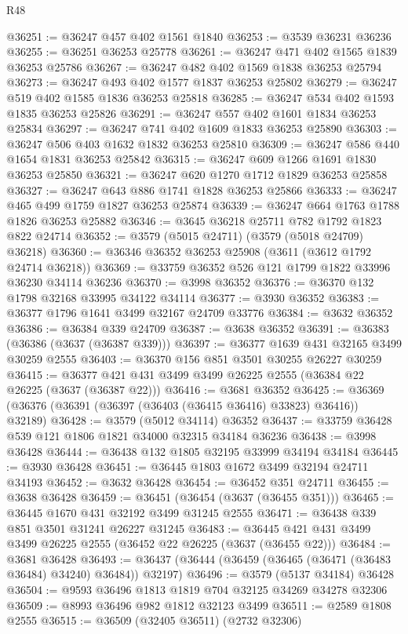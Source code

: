 \begin{lexlean}{R48}
\begin{coremodule}
@36251 := @36247 @457 @402 @1561 @1840
@36253 := @3539 @36231 @36236
@36255 := @36251 @36253 @25778
@36261 := @36247 @471 @402 @1565 @1839 @36253 @25786
@36267 := @36247 @482 @402 @1569 @1838 @36253 @25794
@36273 := @36247 @493 @402 @1577 @1837 @36253 @25802
@36279 := @36247 @519 @402 @1585 @1836 @36253 @25818
@36285 := @36247 @534 @402 @1593 @1835 @36253 @25826
@36291 := @36247 @557 @402 @1601 @1834 @36253 @25834
@36297 := @36247 @741 @402 @1609 @1833 @36253 @25890
@36303 := @36247 @506 @403 @1632 @1832 @36253 @25810
@36309 := @36247 @586 @440 @1654 @1831 @36253 @25842
@36315 := @36247 @609 @1266 @1691 @1830 @36253 @25850
@36321 := @36247 @620 @1270 @1712 @1829 @36253 @25858
@36327 := @36247 @643 @886 @1741 @1828 @36253 @25866
@36333 := @36247 @465 @499 @1759 @1827 @36253 @25874
@36339 := @36247 @664 @1763 @1788 @1826 @36253 @25882
@36346 := @3645 @36218 @25711 @782 @1792 @1823 @822 @24714
@36352 := @3579 (@5015 @24711) (@3579 (@5018 @24709) @36218)
@36360 := @36346 @36352 @36253 @25908 (@3611 (@3612 @1792 @24714 @36218))
@36369 := @33759 @36352 @526 @121 @1799 @1822 @33996 @36230 @34114 @36236
@36370 := @3998 @36352
@36376 := @36370 @132 @1798 @32168 @33995 @34122 @34114
@36377 := @3930 @36352
@36383 := @36377 @1796 @1641 @3499 @32167 @24709 @33776
@36384 := @3632 @36352
@36386 := @36384 @339 @24709
@36387 := @3638 @36352
@36391 := @36383 (@36386 (@3637 (@36387 @339)))
@36397 := @36377 @1639 @431 @32165 @3499 @30259 @2555
@36403 := @36370 @156 @851 @3501 @30255 @26227 @30259
@36415 := @36377 @421 @431 @3499 @3499 @26225 @2555 (@36384 @22 @26225 (@3637 (@36387 @22)))
@36416 := @3681 @36352
@36425 := @36369 (@36376 (@36391 (@36397 (@36403 (@36415 @36416) @33823) @36416)) @32189)
@36428 := @3579 (@5012 @34114) @36352
@36437 := @33759 @36428 @539 @121 @1806 @1821 @34000 @32315 @34184 @36236
@36438 := @3998 @36428
@36444 := @36438 @132 @1805 @32195 @33999 @34194 @34184
@36445 := @3930 @36428
@36451 := @36445 @1803 @1672 @3499 @32194 @24711 @34193
@36452 := @3632 @36428
@36454 := @36452 @351 @24711
@36455 := @3638 @36428
@36459 := @36451 (@36454 (@3637 (@36455 @351)))
@36465 := @36445 @1670 @431 @32192 @3499 @31245 @2555
@36471 := @36438 @339 @851 @3501 @31241 @26227 @31245
@36483 := @36445 @421 @431 @3499 @3499 @26225 @2555 (@36452 @22 @26225 (@3637 (@36455 @22)))
@36484 := @3681 @36428
@36493 := @36437 (@36444 (@36459 (@36465 (@36471 (@36483 @36484) @34240) @36484)) @32197)
@36496 := @3579 (@5137 @34184) @36428
@36504 := @9593 @36496 @1813 @1819 @704 @32125 @34269 @34278 @32306
@36509 := @8993 @36496 @982 @1812 @32123 @3499
@36511 := @2589 @1808 @2555
@36515 := @36509 (@32405 @36511) (@2732 @32306)

\end{coremodule}
\end{lexlean}
